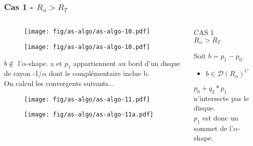 \begin{frame}
  \frametitle{Cas 1 - $R_{\alpha} > R_T$}
\begin{columns}[t]
   \begin{column}{7cm}
      {
        \begin{figure}[H]
          \centering
          \texttt{[image: fig/as-algo/as-algo-10.pdf]}
      \end{figure}
      }
      {
        \begin{figure}[H]
          \centering
          \texttt{[image: fig/as-algo/as-algo-10.pdf]}
       \end{figure}
      }
      {
          \begin{block}{$b \notin$ l'$\alpha$-shape.}
          	a et $p_1$ appartiennent au bord d'un disque de rayon -1/$\alpha$ dont le complémentaire inclue b.\\
          \alert{On calcul les convergents suivants...}
        \end{block}
      }   
      {
        \begin{figure}[H]
          \centering
          \texttt{[image: fig/as-algo/as-algo-11.pdf]}
      \end{figure}
      }
      {
        \begin{figure}[H]
          \centering
          \texttt{[image: fig/as-algo/as-algo-11a.pdf]}
      \end{figure}
      }
   \end{column}
    \begin{column}{3cm}
      \begin{block}{}
        {
          \alert{CAS 1}\\
          \alert{$R_{\alpha} > R_T$}
          
        }
        {
          Soit $b = p_{1} - p_{0}$.
          \begin{itemize}
            \item $b \in \mathcal{D} \left( R_{\alpha} \right)^C$
          \end{itemize}
        }        
        {
					$p_{0} + q_2 * p_1$ n'intersecte pas le disque.\\
				  $p_{1}$ est donc un sommet de l'$\alpha$-shape.			

}
\end{block}
\end{column}
\end{columns}
\end{frame}
